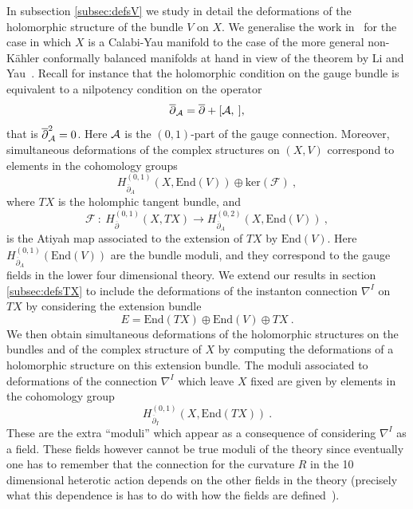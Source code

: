 \documentclass[12pt,a4paper]{article}
\def\bar#1{\overline{#1}}
\def\End{\textrm{End}}
\def\ker{\textrm{ker}}
\def\bp{\bar{\partial}}
\def\F{\mathcal{F}}
\theoremstyle{definition}
\begin{document}
In subsection \ref{subsec:defsV} we study in detail the deformations  of the holomorphic structure of the bundle $V$ on $X$. We generalise the work in~\citep{Anderson:2010mh, Anderson:2011ty} for the case in which $X$ is a Calabi-Yau manifold to the case of the more general non-K\"ahler conformally balanced manifolds at hand in view of the theorem by Li and Yau~\citep{MR915839}. 
Recall for instance that the holomorphic condition on the gauge bundle is equivalent to a nilpotency condition on the operator
\begin{equation*}
\bp_{\cal A}=\bp+[{\cal A},\:],
\end{equation*}
that is $\bp_{\cal A}^2=0$. Here $\cal A$ is the $(0,1)$-part of the gauge connection. Moreover, simultaneous deformations of the complex structures on $(X,V)$ correspond to elements in the cohomology groups
\begin{equation*}
H^{(0,1)}_{\bp_A}(X,\End(V))\oplus\ker(\F)\:,
\end{equation*}
where $TX$ is the holomphic tangent bundle, and
\begin{equation*}
\F\::\:H^{(0,1)}_{\bp}(X,TX)\rightarrow H^{(0,2)}_{\bp_A}(X,\End(V))~,
\end{equation*}
 is the Atiyah map associated to the extension of $TX$ by $\End(V)$. Here $H^{(0,1)}_{\bp_A}(\End(V))$ are the bundle moduli, and they correspond to the gauge fields in the lower four dimensional theory.
 We extend our results in section \ref{subsec:defsTX} to include the deformations of the instanton connection $\nabla^I$ on $TX$ by considering the extension bundle
 \[ E= \End(TX)\oplus \End(V)\oplus TX~.\]
 We then obtain simultaneous deformations of the holomorphic structures on the bundles and of the complex structure of $X$ by computing the deformations of a holomorphic structure on this extension bundle. The moduli associated to deformations of the connection $\nabla^I$ which leave $X$ fixed are given by elements in the cohomology group
\begin{equation*}
H^{(0,1)}_{\bp_I}(X,\End(TX))\:.
\end{equation*}
These are the extra ``moduli'' which appear as a consequence of considering $\nabla^I$ as a field. These fields however cannot be true moduli of the theory since eventually one has to remember that the connection for the curvature $R$ in the 10 dimensional heterotic action depends on the other fields in the theory (precisely what this dependence is has to do with how the fields are defined~\citep{Sen1986289}).  
\end{document}
